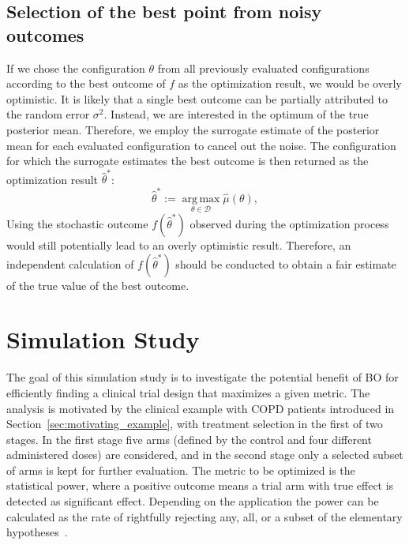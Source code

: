 \documentclass[bimj,fleqn]{w-art}
\theoremstyle{plain}
\theoremstyle{definition}
\begin{document}
\subsection{Selection of the best point from noisy outcomes}
\label{ssec:best_point}
If we chose the configuration $\theta$ from all previously evaluated configurations according to the best outcome of $f$ as the optimization result, we would be overly optimistic.
It is likely that a single best outcome can be partially attributed to the random error $\sigma^2$.
Instead, we are interested in the optimum of the true posterior mean.
Therefore, we employ the surrogate estimate of the posterior mean for each evaluated configuration to cancel out the noise.
The configuration for which the surrogate estimates the best outcome is then returned as the optimization result $\hat{\theta}^\ast$:
\begin{equation}
  \hat{\theta}^{\ast} := \operatorname{arg\,max}\limits_{\theta \in \mathcal{D}} \hat{\mu}(\theta),
\end{equation}
Using the stochastic outcome $f(\hat{\theta}^\ast) $ observed during the optimization process would still potentially lead to an overly optimistic result.
Therefore, an independent calculation of $f(\hat{\theta}^\ast)$ should be conducted to obtain a fair estimate of the true value of the best outcome.

\section{Simulation Study}
\label{sec:simulation_study}

The goal of this simulation study is to investigate the potential benefit of BO for efficiently finding a clinical trial design that maximizes a given metric.
The analysis is motivated by the clinical example with COPD patients introduced in Section~\ref{sec:motivating_example}, with treatment selection in the first of two stages.
In the first stage five arms (defined by the control and four different administered doses) are considered, and in the second stage only a selected subset of arms is kept for further evaluation. 
The metric to be optimized is the statistical power, where a positive outcome means a trial arm with true effect is detected as significant effect.
Depending on the application the power can be calculated as the rate of rightfully rejecting any, all, or a subset of the elementary hypotheses~\citet{senn_power_2007}.
\end{document}
